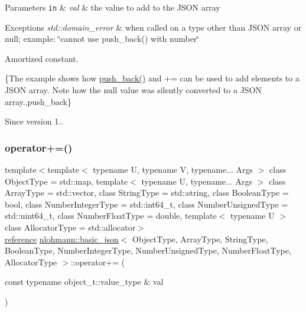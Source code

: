 \begin{DoxyParams}[1]{Parameters}
\mbox{\tt in}  & {\em val} & the value to add to the J\+S\+ON array\\
\hline
\end{DoxyParams}

\begin{DoxyExceptions}{Exceptions}
{\em std\+::domain\+\_\+error} & when called on a type other than J\+S\+ON array or null; example\+: {\ttfamily \char`\"{}cannot use push\+\_\+back() with number\char`\"{}}\\
\hline
\end{DoxyExceptions}
Amortized constant.

\{The example shows how {\ttfamily \hyperlink{classnlohmann_1_1basic__json_a486b96adbf4886c38e38c952394a220f}{push\+\_\+back()}} and {\ttfamily +=} can be used to add elements to a J\+S\+ON array. Note how the {\ttfamily null} value was silently converted to a J\+S\+ON array.,push\+\_\+back\}

\begin{DoxySince}{Since}
version 1.. 
\end{DoxySince}
\hypertarget{classnlohmann_1_1basic__json_a9486a272e034c0548305d7a12f3045e6}{}\label{classnlohmann_1_1basic__json_a9486a272e034c0548305d7a12f3045e6} 
\subsubsection{\texorpdfstring{operator+=()}{operator+=()}\hspace{0.1cm}{\footnotesize\ttfamily [3/4]}}
{\footnotesize\ttfamily template$<$template$<$ typename U, typename V, typename... Args $>$ class Object\+Type = std\+::map, template$<$ typename U, typename... Args $>$ class Array\+Type = std\+::vector, class String\+Type  = std\+::string, class Boolean\+Type  = bool, class Number\+Integer\+Type  = std\+::int64\+\_\+t, class Number\+Unsigned\+Type  = std\+::uint64\+\_\+t, class Number\+Float\+Type  = double, template$<$ typename U $>$ class Allocator\+Type = std\+::allocator$>$ \\
\hyperlink{classnlohmann_1_1basic__json_a3ec8e17be8732fe436e9d6733f52b7a3}{reference} \hyperlink{classnlohmann_1_1basic__json}{nlohmann\+::basic\+\_\+json}$<$ Object\+Type, Array\+Type, String\+Type, Boolean\+Type, Number\+Integer\+Type, Number\+Unsigned\+Type, Number\+Float\+Type, Allocator\+Type $>$\+::operator+= (\begin{DoxyParamCaption}\item[{const typename object\+\_\+t\+::value\+\_\+type \&}]{val }\end{DoxyParamCaption})\hspace{0.3cm}{\ttfamily [inline]}}



